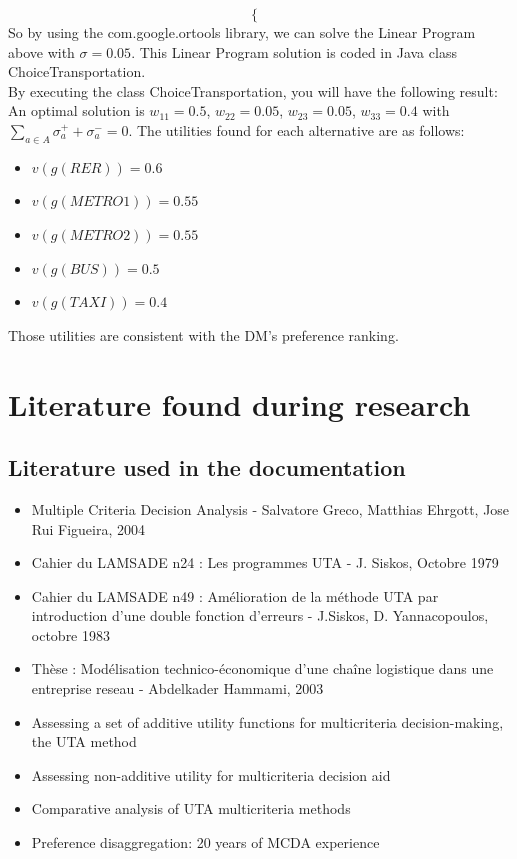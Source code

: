 \documentclass{report}
\begin{document}
\begin{appendices}
\begin{equation}
\begin{cases}
	\end{cases}
\end{equation}
So by using the com.google.ortools library, we can solve the Linear Program above with $\sigma = 0.05$. This Linear Program solution is coded in Java class ChoiceTransportation.\\
By executing the class ChoiceTransportation, you will have the following result: \\

An optimal solution is $w_{11} = 0.5$, $w_{22} = 0.05$, $w_{23} = 0.05$, $w_{33} = 0.4$ with $\sum_{a \in A} \sigma _{a}^{+} + \sigma _{a}^{-} = 0$. The utilities found for each alternative are as follows: \\ 
\begin{itemize}
\item $v(g(RER)) = 0.6$
\item $v(g(METRO1)) = 0.55$
\item $v(g(METRO2)) = 0.55$
\item $v(g(BUS)) = 0.5$
\item $v(g(TAXI)) = 0.4 $
\end{itemize}
Those utilities are consistent with the DM's preference ranking. \\

\chapter{Literature found during research}
\section{Literature used in the documentation}
\begin{itemize}
\item Multiple Criteria Decision Analysis - Salvatore Greco, Matthias Ehrgott, Jose Rui Figueira, 2004
\item Cahier du LAMSADE n24 : Les programmes UTA - J. Siskos, Octobre 1979
\item Cahier du LAMSADE n49 : Amélioration de la méthode UTA par introduction d’une double fonction d’erreurs - J.Siskos, D. Yannacopoulos, octobre 1983
\item Thèse : Modélisation technico-économique d’une chaîne logistique dans une entreprise reseau - Abdelkader Hammami, 2003
\item Assessing a set of additive utility functions for multicriteria decision-making, the UTA method
\item Assessing non-additive utility for multicriteria decision aid
\item Comparative analysis of UTA multicriteria methods
\item Preference disaggregation: 20 years of MCDA experience
\end{itemize}


\end{appendices}
\end{document}
